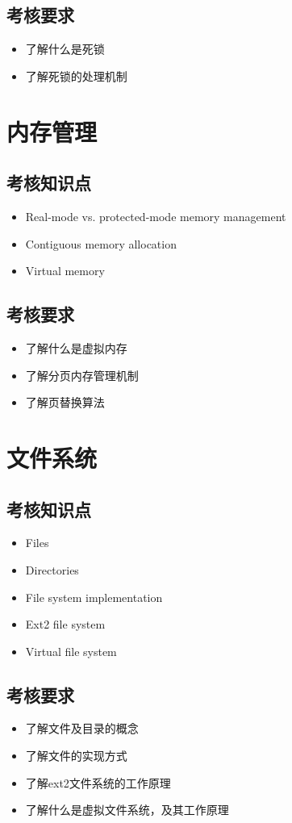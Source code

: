 \documentclass[11pt]{article}
\begin{document}
\subsection{考核要求}
\label{sec-5-2}
\begin{itemize}
\item 了解什么是死锁
\item 了解死锁的处理机制
\end{itemize}
\section{内存管理}
\label{sec-6}
\subsection{考核知识点}
\label{sec-6-1}
\begin{itemize}
\item Real-mode vs. protected-mode memory management
\item Contiguous memory allocation
\item Virtual memory
\end{itemize}
\subsection{考核要求}
\label{sec-6-2}
\begin{itemize}
\item 了解什么是虚拟内存
\item 了解分页内存管理机制
\item 了解页替换算法
\end{itemize}
\section{文件系统}
\label{sec-7}
\subsection{考核知识点}
\label{sec-7-1}
\begin{itemize}
\item Files
\item Directories
\item File system implementation
\item Ext2 file system
\item Virtual file system
\end{itemize}
\subsection{考核要求}
\label{sec-7-2}
\begin{itemize}
\item 了解文件及目录的概念
\item 了解文件的实现方式
\item 了解ext2文件系统的工作原理
\item 了解什么是虚拟文件系统，及其工作原理
\end{itemize}
\end{document}
